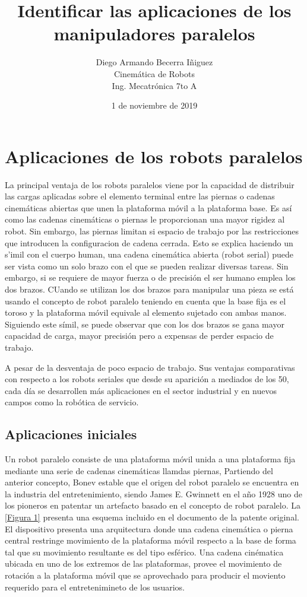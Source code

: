 \documentclass[letter,openrigh,12pt,spanish]{report}
\title{\textbf{Identificar las aplicaciones de los manipuladores paralelos}}
\author{Diego Armando Becerra Iñiguez\\
		Cinem\'atica de Robots\\
		Ing. Mecatr\'onica 7to A}
\date{1 de noviembre de 2019}
\begin{document}
\maketitle

\section{Aplicaciones de los robots paralelos}

La principal ventaja de los robots paralelos viene por la capacidad de distribuir las cargas aplicadas sobre el elemento terminal entre las piernas o cadenas cinem\'aticas abiertas que unen la plataforma m\'ovil a la plataforma base. Es as\'i como las cadenas cinem\'aticas o piernas le proporcionan una mayor rigidez al robot. Sin embargo, las piernas limitan si espacio de trabajo por las restricciones que introducen la configuracion de cadena cerrada. Esto se explica haciendo un s'imil con el cuerpo human, una cadena cinem\'atica abierta (robot serial) puede ser vista como un solo brazo con el que se pueden realizar diversas tareas. Sin embargo, si se requiere de mayor fuerza o de precisi\'on el ser humano emplea los dos brazos. CUando se utilizan los dos brazos para manipular una pieza se est\'a usando el concepto de robot paralelo teniendo en cuenta que la base fija es el toroso y la plataforma m\'ovil equivale al elemento sujetado con ambas manos. Siguiendo este s\'imil, se puede observar que con los dos brazos se gana mayor capacidad de carga, mayor precisi\'on pero a expensas de perder espacio de trabajo.

A pesar de la desventaja de poco espacio de trabajo. Sus ventajas comparativas con respecto a los robots seriales que desde su aparici\'on a mediados de los 50, cada d\'ia se desarrollen m\'as aplicaciones en el sector industrial y en nuevos campos como la rob\'otica de servicio. 

\subsection{Aplicaciones iniciales}

Un robot paralelo consiste de una plataforma m\'ovil unida a una plataforma fija mediante una serie de cadenas cinem\'aticas llamdas piernas, Partiendo del anterior concepto, Bonev estable que el origen del robot paralelo se encuentra en la industria del entretenimiento, siendo James E. Gwinnett en el año 1928 uno de los pioneros en patentar un artefacto basado en el concepto de robot paralelo. La \ref{Figura 1} presenta una esquema incluido en el documento de la patente original. El dispositivo presenta una arquitectura donde una cadena cinem\'atica o pierna central restringe movimiento de la plataforma m\'ovil respecto a la base de forma tal que su movimiento resultante es del tipo esf\'erico. Una cadena cin\'ematica ubicada en uno de los extremos de las plataformas, provee el movimiento de rotaci\'on a la plataforma m\'ovil que se aprovechado para producir el moviento requerido para el entretenimineto de los usuarios.
\end{document}
